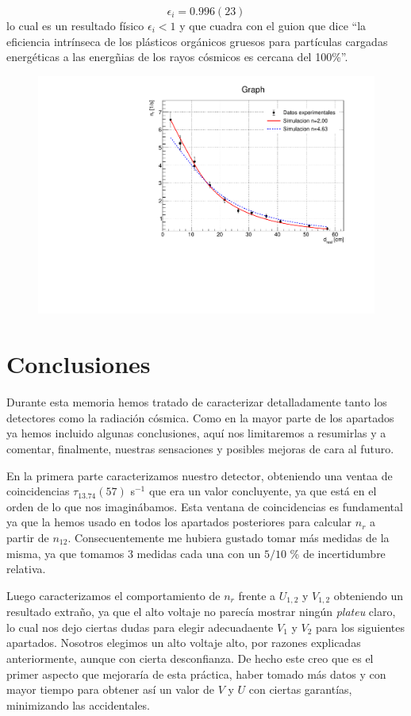 \documentclass[11pt]{article}
\begin{document}
\begin{equation}
	\epsilon_i = 0.996(23)
\end{equation}
lo cual es un resultado físico $\epsilon_i<1$ y que cuadra con el guion \cite{P2} que dice ``la eficiencia intrínseca de los plásticos orgánicos gruesos para partículas cargadas energéticas a las energñias de los rayos cósmicos es cercana del 100\%''.

\begin{figure}[h!]
	\centering
	\label{Fig:montecarlo}
	\includegraphics[width=0.7\linewidth]{../Graficas/Montecarlo.pdf}
\end{figure}




\section{Conclusiones}

Durante esta memoria hemos tratado de caracterizar detalladamente tanto los detectores como la radiación cósmica. Como en la mayor parte de los apartados ya hemos incluido algunas conclusiones, aquí nos limitaremos a resumirlas y a comentar, finalmente, nuestras sensaciones y posibles mejoras de cara al futuro. 

En la primera parte caracterizamos nuestro detector, obteniendo una ventaa de coincidencias $\tau_13.74(57)$ s$^{-1}$ que era un valor concluyente, ya que está en el orden de lo que nos imaginábamos. Esta ventana de coincidencias es fundamental ya que la hemos usado en todos los apartados posteriores para calcular $n_r$ a partir de $n_{12}$. Consecuentemente me hubiera gustado tomar más medidas de la misma, ya que tomamos 3 medidas cada una con un $5/10$ \% de incertidumbre relativa. 

Luego caracterizamos el comportamiento de $n_r$ frente a $U_{1,2}$ y $V_{1,2}$ obteniendo un resultado extraño, ya que el alto voltaje no parecía mostrar ningún \textit{plateu} claro, lo cual nos dejo ciertas dudas para elegir adecuadaente $V_1$ y $V_2$ para los siguientes apartados. Nosotros elegimos un alto voltaje alto, por razones explicadas anteriormente, aunque con cierta desconfianza. De hecho este creo que es el primer aspecto que mejoraría de esta práctica, haber tomado más datos y con mayor tiempo para obtener así un valor de $V$ y $U$ con ciertas garantías, minimizando las accidentales.
\end{document}
